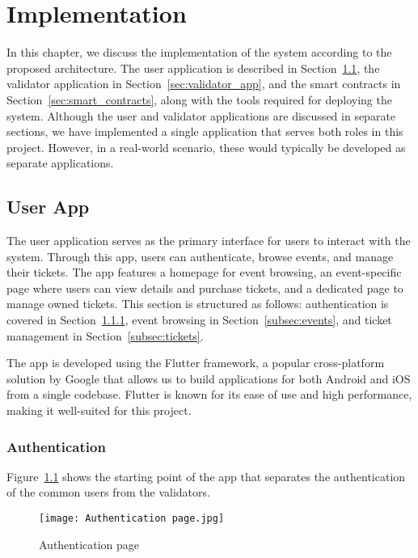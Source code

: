 \chapter{Implementation}\label{ch:implementation}

In this chapter, we discuss the implementation of the system according to the
proposed architecture. The user application is described in
Section~\ref{sec:user_app}, the validator application in
Section~\ref{sec:validator_app}, and the smart contracts in
Section~\ref{sec:smart_contracts}, along with the tools required for deploying
the system. Although the user and validator applications are discussed in
separate sections, we have implemented a single application that serves both
roles in this project. However, in a real-world scenario, these would typically
be developed as separate applications.

\section{User App}\label{sec:user_app}

The user application serves as the primary interface for users to interact with
the system. Through this app, users can authenticate, browse events, and manage
their tickets. The app features a homepage for event browsing, an
event-specific page where users can view details and purchase tickets, and a
dedicated page to manage owned tickets. This section is structured as follows:
authentication is covered in Section~\ref{subsec:authentication}, event
browsing in Section~\ref{subsec:events}, and ticket management in
Section~\ref{subsec:tickets}.

The app is developed using the Flutter framework, a popular cross-platform
solution by Google that allows us to build applications for both Android and
iOS from a single codebase. Flutter is known for its ease of use and high
performance, making it well-suited for this project.

\subsection{Authentication}\label{subsec:authentication}

Figure~\ref{fig:authentication_page} shows the starting point of the app that
separates the authentication of the common users from the validators.

\begin{figure}[H]
	\centering
	\texttt{[image: Authentication page.jpg]}
	\caption{Authentication page}\label{fig:authentication_page}
\end{figure}

